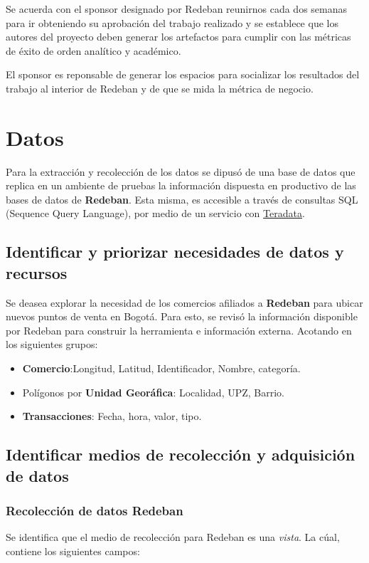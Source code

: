 \documentclass[a4paper]{article}
\begin{document}
Se acuerda con el sponsor designado por Redeban reunirnos cada dos semanas para ir obteniendo su aprobación del trabajo realizado y se establece que los autores del proyecto deben generar los artefactos para cumplir con las métricas de éxito de orden analítico y académico.

El sponsor es reponsable de generar los espacios para socializar los resultados del trabajo al interior de Redeban y de que se mida la métrica de negocio.


\section{Datos}

Para la extracción y recolección de los datos se dipusó de una base de datos que replica en un ambiente de pruebas
la información dispuesta en productivo de las bases de datos de \textbf{Redeban}. Esta misma, es accesible a
través de consultas SQL (Sequence Query Language), por medio de un servicio
con \href{https://www.teradata.com.es/}{Teradata}.

\subsection{Identificar y priorizar necesidades de datos y recursos}

Se deasea explorar la necesidad de los comercios afiliados a \textbf{Redeban} para ubicar nuevos puntos de venta en Bogotá.
Para esto, se revisó la información disponible por Redeban para construir la herramienta e información externa. Acotando en los siguientes grupos:

\begin{itemize}
	\item \textbf{Comercio}:Longitud, Latitud, Identificador, Nombre, categoría.
	\item Polígonos por \textbf{Unidad Georáfica}: Localidad, UPZ, Barrio.
	\item \textbf{Transacciones}: Fecha, hora, valor, tipo.
\end{itemize}

\subsection{Identificar medios de recolección y adquisición de datos}

\subsubsection{Recolección de datos Redeban}
Se identifica que el medio de recolección para Redeban es una \textit{vista}. La cúal, contiene los siguientes campos:
\end{document}
